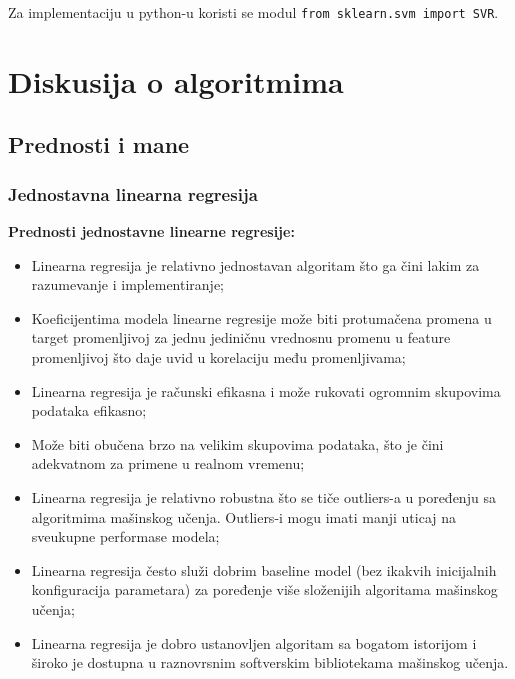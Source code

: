 \documentclass[fontsize=12bp, paper=a4]{scrarticle}
\begin{document}
Za implementaciju u python-u koristi se modul \verb|from sklearn.svm import SVR|.

\newpage

\section{Diskusija o algoritmima}
\subsection{Prednosti i mane}
\subsubsection{Jednostavna linearna regresija}
\textbf{Prednosti jednostavne linearne regresije:\cite{slr}} 
\begin{itemize}
    \item Linearna regresija je relativno jednostavan algoritam što ga čini lakim za razumevanje i implementiranje;
    \item Koeficijentima modela linearne regresije može biti protumačena promena u target promenljivoj za jednu jediničnu vrednosnu promenu u feature promenljivoj što daje uvid u korelaciju među promenljivama;
    \item Linearna regresija je računski efikasna i može rukovati ogromnim skupovima podataka efikasno;
    \item Može biti obučena brzo na velikim skupovima podataka, što je čini adekvatnom za primene u realnom vremenu;
    \item Linearna regresija je relativno robustna što se tiče outliers-a u poređenju sa algoritmima mašinskog učenja.  Outliers-i mogu imati manji uticaj na sveukupne performase modela;
    \item Linearna regresija često služi dobrim baseline model (bez ikakvih inicijalnih konfiguracija parametara) za poređenje više složenijih algoritama mašinskog učenja;
    \item Linearna regresija je dobro ustanovljen algoritam sa bogatom istorijom i široko je dostupna u raznovrsnim softverskim bibliotekama mašinskog učenja.
\end{itemize}
\end{document}
